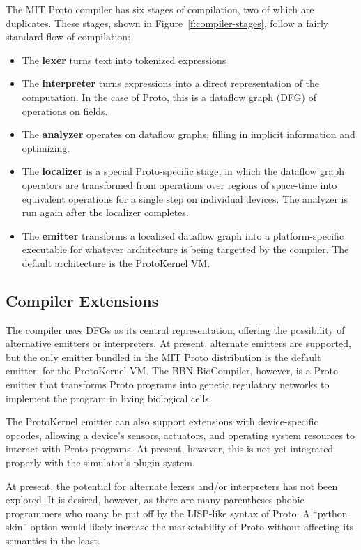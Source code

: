 \documentclass{article}
\begin{document}
The MIT Proto compiler has six stages of compilation, two of which are
duplicates.  These stages, shown in Figure~\ref{f:compiler-stages}, follow a
fairly standard flow of compilation:
\begin{itemize}
  \item The {\bf lexer} turns text into tokenized expressions
  \item The {\bf interpreter} turns expressions into a direct representation of
  the computation.  In the case of Proto, this is a dataflow graph (DFG) of
  operations on fields.
  \item The {\bf analyzer} operates on dataflow graphs, filling in implicit
  information and optimizing.
  \item The {\bf localizer} is a special Proto-specific stage, in
  which the dataflow graph operators are transformed from operations over
  regions of space-time into equivalent operations for a single step on
  individual devices.  The analyzer is run again after the localizer completes.
  \item The {\bf emitter} transforms a localized dataflow graph into a
  platform-specific executable for whatever architecture is being targetted by
  the compiler.  The default architecture is the ProtoKernel VM.
\end{itemize}

\subsection{Compiler Extensions}

The compiler uses DFGs as its central representation, offering the possibility
of alternative emitters or interpreters.  At present, alternate emitters are
supported, but the only emitter bundled in the MIT Proto distribution is the
default emitter, for the ProtoKernel VM.  The BBN BioCompiler, however, is a
Proto emitter that transforms Proto programs into genetic regulatory networks to
implement the program in living biological cells.

The ProtoKernel emitter can also support extensions with device-specific
opcodes, allowing a device's sensors, actuators, and operating system resources
to interact with Proto programs.  At present, however, this is not yet
integrated properly with the simulator's plugin system.

At present, the potential for alternate lexers and/or interpreters has not been
explored.  It is desired, however, as there are many parentheses-phobic
programmers who many be put off by the LISP-like syntax of Proto.  A ``python
skin'' option would likely increase the marketability of Proto without affecting
its semantics in the least.
\end{document}
